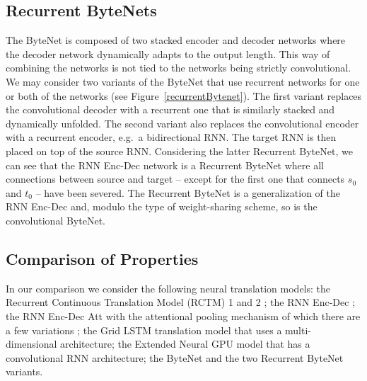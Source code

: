 \documentclass{article}
\begin{document}
\subsection{Recurrent ByteNets}
The ByteNet is composed of two stacked encoder and decoder networks where the decoder network dynamically adapts to the output length. This way of combining the networks is not tied to the networks being strictly convolutional. We may consider two variants of the ByteNet that use recurrent networks for one or both of the networks (see Figure~\ref{recurrentBytenet}).
The first variant replaces the convolutional decoder with a recurrent one that is similarly stacked and dynamically unfolded. The second variant also replaces the convolutional encoder with a recurrent encoder, e.g.\ a bidirectional RNN. The target RNN is then placed on top of the source RNN. Considering the latter Recurrent ByteNet, we can see that the  RNN Enc-Dec network  \citep{DBLP:conf/nips/SutskeverVL14,DBLP:journals/corr/ChoMGBSB14}  is a Recurrent ByteNet where all connections between source and target -- except for the first one that connects $s_0$ and $t_0$ -- have been severed. The Recurrent ByteNet is a generalization of the RNN Enc-Dec and, modulo the type of weight-sharing scheme, so is the convolutional ByteNet. 







\subsection{Comparison of Properties}

In our comparison we consider the following neural translation models: the Recurrent Continuous Translation Model (RCTM) 1 and 2 \citep{kalchbrenner13emnlp}; the RNN Enc-Dec \citep{DBLP:conf/nips/SutskeverVL14,DBLP:journals/corr/ChoMGBSB14}; the RNN Enc-Dec Att with the attentional pooling mechanism \citep{DBLP:journals/corr/BahdanauCB14} of which there are a few variations \citep{luong-pham-manning:2015:EMNLP,chung2016hierarchical}; the Grid LSTM translation model \citep{DBLP:journals/corr/KalchbrennerDG15} that uses a multi-dimensional architecture; the Extended Neural GPU model \citep{kaiser2016active} that has a convolutional RNN architecture; the ByteNet and the two Recurrent ByteNet variants.
\end{document}

